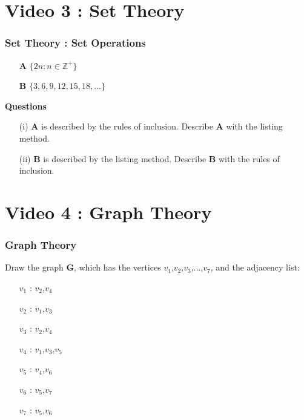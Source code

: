 \documentclass{beamer}
\begin{document}
\section{Video 3 : Set Theory}
\begin{frame}
\frametitle{Set Theory : Set Operations}
\Large
\begin{itemize}
\item[\textbf{A}] $ \{ 2n : n \in \mathbb{Z^{+}} \} $
\item[\textbf{B}] $ \{ 3,6,9,12,15,18,\ldots \} $
\end{itemize}
\textbf{Questions}
\begin{itemize}
\item[(i)] \textbf{A} is described by the rules of inclusion. Describe \textbf{A} with the listing method.
\item[(ii)] \textbf{B} is described by the listing method. Describe \textbf{B} with the rules of inclusion. 
\end{itemize}
\end{frame}

\section{Video 4 : Graph Theory}
\begin{frame}
\frametitle{Graph Theory}
\Large
\vspace{-0.7cm}
Draw the graph \textbf{G}, which has the vertices $v_1$,$v_2$,$v_3$,$\ldots$,$v_7$, and the adjacency list:

\begin{itemize}
\item[$v_1$]: $v_2$,$v_4$
\item[$v_2$]: $v_1$,$v_3$
\item[$v_3$]: $v_2$,$v_4$
\item[$v_4$]: $v_1$,$v_3$,$v_5$
\item[$v_5$]: $v_4$,$v_6$
\item[$v_6$]: $v_5$,$v_7$
\item[$v_7$]: $v_5$,$v_6$
\end{itemize}
\end{frame}
\end{document}
